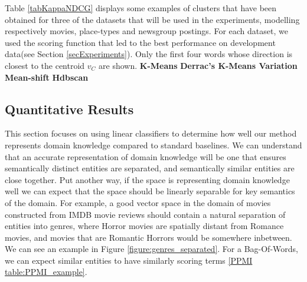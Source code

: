 Table \ref{tabKappaNDCG} displays some examples of clusters that have been obtained for three of the datasets that will be used in the experiments, modelling respectively movies, place-types and newsgroup postings. For each dataset, we used the scoring function that led to the best performance on development data(see Section \ref{secExperiments}). Only the first four words whose direction is closest to the centroid $v_C$ are shown.
\noindent \textbf{K-Means}
\noindent \textbf{Derrac's K-Means Variation}
\noindent \textbf{Mean-shift}
\noindent \textbf{Hdbscan}



\subsection{Quantitative Results}

This section focuses on using linear classifiers to determine how well our method represents domain knowledge compared to standard baselines. We can understand that an accurate representation of domain knowledge will be one that ensures semantically distinct entities are separated, and semantically similar entities are close together. Put another way, if the space is representing domain knowledge well we can expect that the space should be linearly separable for key semantics of the domain. For example, a good vector space in the domain of movies constructed from IMDB movie reviews should contain a natural separation of entities into genres, where Horror movies are spatially distant from Romance movies, and movies that are Romantic Horrors would be somewhere inbetween. We can see an example in Figure \ref{figure:genres_separated}. For a Bag-Of-Words, we can expect similar entities to have similarly scoring terms \ref{PPMI table:PPMI_example}.

